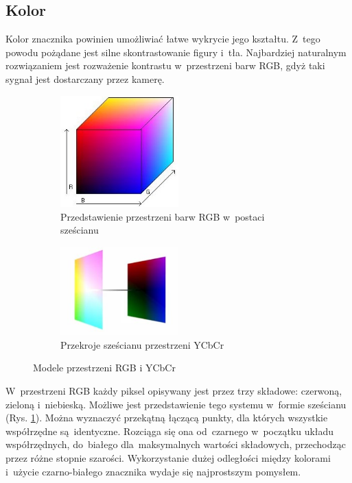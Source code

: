 \subsection{Kolor}
\label{subsec:kolor}
Kolor znacznika powinien umożliwiać łatwe wykrycie jego kształtu. Z~tego powodu pożądane jest silne skontrastowanie figury i~tła. Najbardziej naturalnym rozwiązaniem jest rozważenie kontrastu w~przestrzeni barw RGB, gdyż taki sygnał jest dostarczany przez kamerę.\\
\begin{figure}[h]
	\centering
	\begin{subfigure}{0.4\textwidth}
		\centering
		\includegraphics[width=0.5\textwidth]{szescian_rgb.jpg}
		\caption{Przedstawienie przestrzeni barw RGB w~postaci sześcianu \cite{obrazek_rgb}}
		\label{fig:szescian_rgb}
	\end{subfigure}%
	\begin{subfigure}{0.4\textwidth}
		\centering
		\includegraphics[width=0.5\textwidth]{szescian_ycbcr.jpg}
		\caption{Przekroje sześcianu przestrzeni YCbCr \cite{obrazek_ycbcr}}
		\label{fig:szescian_ycbcr}
	\end{subfigure}%
	\caption{Modele przestrzeni RGB i YCbCr}
	\label{fig:modele_przestrzeni}
\end{figure}
W~przestrzeni RGB każdy piksel opisywany jest przez trzy składowe: czerwoną, zieloną i~niebieską. Możliwe jest przedstawienie tego systemu w~formie sześcianu (Rys. \ref{fig:szescian_rgb}). Można wyznaczyć przekątną łączącą punkty, dla których wszystkie współrzędne są~identyczne. Rozciąga się ona od~czarnego w~początku układu współrzędnych, do~białego dla~maksymalnych wartości składowych, przechodząc przez różne stopnie szarości. Wykorzystanie dużej odległości między kolorami i~użycie czarno-białego znacznika wydaje się najprostszym pomysłem.\\
